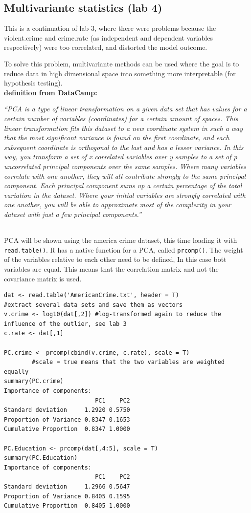 \documentclass{article}
\begin{document}
\subsection{Multivariante statistics (lab 4)}
This is a continuation of lab 3, where there were problems because the violent.crime and crime.rate (as independent and dependent variables respectively) were too correlated, and distorted the model outcome. \par 
To solve this problem, multivariante methods can be used where the goal is to reduce data in high dimensional space into something more interpretable (for hypothesis testing).  \\
\textbf{definition from DataCamp:}\\
\begin{small}
\begin{center}
\textit{“PCA is a type of linear transformation on a given data set that has values
for a certain number of variables (coordinates) for a certain amount of
spaces. This linear transformation fits this dataset to a new coordinate
system in such a way that the most significant variance is found on the first
coordinate, and each subsequent coordinate is orthogonal to the last and
has a lesser variance. In this way, you transform a set of x correlated
variables over y samples to a set of p uncorrelated principal components
over the same samples. Where many variables correlate with one another,
they will all contribute strongly to the same principal component.
Each principal component sums up a certain percentage of the total
variation in the dataset. Where your initial variables are strongly
correlated with one another, you will be able to approximate most of the
complexity in your dataset with just a few principal components.”}
\end{center}
\end{small} \\
PCA will be shown using the america crime dataset, this time loading it with \texttt{read.table()}. R has a native function for a PCA, called  \texttt{prcomp()}. The weight of the variables relative to each other need to be defined, In this case bott variables are equal. This means that the correlation matrix and not the covariance matrix is used.

\begin{lstlisting}
dat <- read.table('AmericanCrime.txt', header = T)
#extract several data sets and save them as vectors
v.crime <- log10(dat[,2]) #log-transformed again to reduce the influence of the outlier, see lab 3
c.rate <- dat[,1]

PC.crime <- prcomp(cbind(v.crime, c.rate), scale = T)
        #scale = true means that the two variables are weighted equally
summary(PC.crime) 
Importance of components:
                          PC1    PC2
Standard deviation     1.2920 0.5750
Proportion of Variance 0.8347 0.1653
Cumulative Proportion  0.8347 1.0000

PC.Education <- prcomp(dat[,4:5], scale = T)
summary(PC.Education)
Importance of components:
                          PC1    PC2
Standard deviation     1.2966 0.5647
Proportion of Variance 0.8405 0.1595
Cumulative Proportion  0.8405 1.0000
\end{lstlisting}
\end{document}
